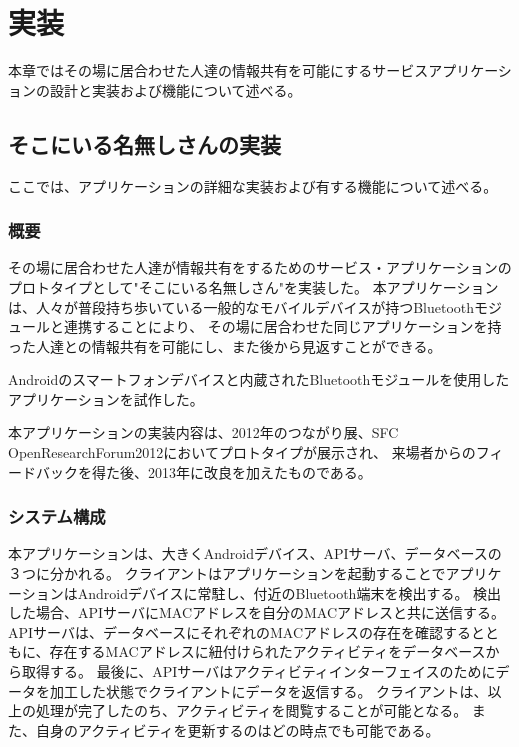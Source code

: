 \chapter{実装}\label{chap:implementation_1}

本章ではその場に居合わせた人達の情報共有を可能にするサービスアプリケーションの設計と実装および機能について述べる。

\newpage

\section{そこにいる名無しさんの実装}

ここでは、アプリケーションの詳細な実装および有する機能について述べる。

\subsection{概要}

その場に居合わせた人達が情報共有をするためのサービス・アプリケーションのプロトタイプとして"そこにいる名無しさん"を実装した。
本アプリケーションは、人々が普段持ち歩いている一般的なモバイルデバイスが持つBluetoothモジュールと連携することにより、
その場に居合わせた同じアプリケーションを持った人達との情報共有を可能にし、また後から見返すことができる。

Androidのスマートフォンデバイスと内蔵されたBluetoothモジュールを使用したアプリケーションを試作した。

本アプリケーションの実装内容は、2012年のつながり展、SFC OpenResearchForum2012においてプロトタイプが展示され、
来場者からのフィードバックを得た後、2013年に改良を加えたものである。


\subsection{システム構成}

本アプリケーションは、大きくAndroid\cite{AndroidDevelopers}デバイス、APIサーバ、データベースの３つに分かれる。
クライアントはアプリケーションを起動することでアプリケーションはAndroidデバイスに常駐し、付近のBluetooth端末を検出する。
検出した場合、APIサーバにMACアドレスを自分のMACアドレスと共に送信する。
APIサーバは、データベースにそれぞれのMACアドレスの存在を確認するとともに、存在するMACアドレスに紐付けられたアクティビティをデータベースから取得する。
最後に、APIサーバはアクティビティインターフェイスのためにデータを加工した状態でクライアントにデータを返信する。
クライアントは、以上の処理が完了したのち、アクティビティを閲覧することが可能となる。
また、自身のアクティビティを更新するのはどの時点でも可能である。

